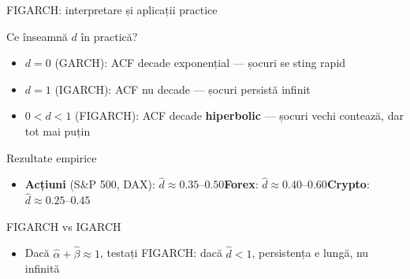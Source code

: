 \documentclass[9pt, aspectratio=169, t]{beamer}
\begin{document}
\begin{frame}{FIGARCH: interpretare și aplicații practice}
    \small
        \begin{block}{Ce înseamnă $d$ în practică?}
            \begin{itemize}
                \item \textbf{$d = 0$} (GARCH): ACF decade exponențial --- șocuri se sting rapid
                \item \textbf{$d = 1$} (IGARCH): ACF nu decade --- șocuri persistă infinit
                \item \textbf{$0 < d < 1$} (FIGARCH): ACF decade \textbf{hiperbolic} --- șocuri vechi contează, dar tot mai puțin
            \end{itemize}
        \end{block}
        \vspace{-1mm}
        \begin{exampleblock}{Rezultate empirice}
            \begin{itemize}
                \item \textbf{Acțiuni} (S\&P 500, DAX): $\hat{d} \approx 0.35$--$0.50$\quad \textbf{Forex}: $\hat{d} \approx 0.40$--$0.60$\quad \textbf{Crypto}: $\hat{d} \approx 0.25$--$0.45$
            \end{itemize}
        \end{exampleblock}
        \vspace{-1mm}
        \begin{alertblock}{FIGARCH vs IGARCH}
            \begin{itemize}
                \item Dacă $\hat{\alpha} + \hat{\beta} \approx 1$, testați FIGARCH: dacă $\hat{d} < 1$, persistența e lungă, nu infinită
            \end{itemize}
        \end{alertblock}
\end{frame}
\end{document}
